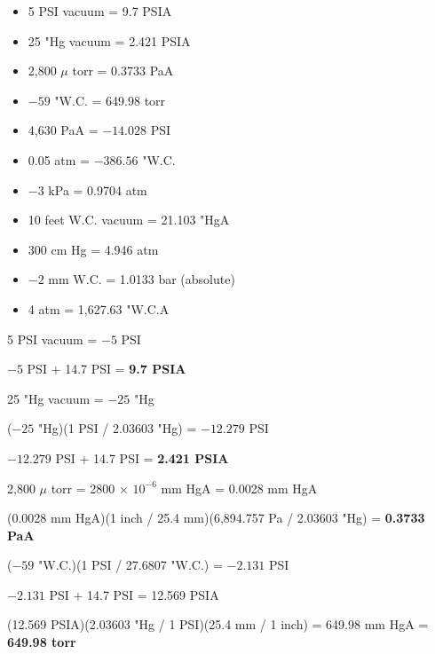 





\begin{itemize}
\item{} 5 PSI vacuum = 9.7 PSIA
\vskip 5pt
\item{} 25 "Hg vacuum = 2.421 PSIA
\vskip 5pt
\item{} 2,800 $\mu$ torr = 0.3733 PaA
\vskip 5pt
\item{} $-59$ "W.C. = 649.98 torr
\vskip 5pt
\item{} 4,630 PaA = $-14.028$ PSI
\vskip 5pt
\item{} 0.05 atm = $-386.56$ "W.C.
\vskip 5pt
\item{} $-3$ kPa = 0.9704 atm
\vskip 5pt
\item{} 10 feet W.C. vacuum = 21.103 "HgA
\vskip 5pt
\item{} 300 cm Hg = 4.946 atm
\vskip 5pt
\item{} $-2$ mm W.C. = 1.0133 bar (absolute)
\vskip 5pt
\item{} 4 atm = 1,627.63 "W.C.A
\end{itemize}








5 PSI vacuum = $-5$ PSI

$-5$ PSI + 14.7 PSI = {\bf 9.7 PSIA}


\vskip 10pt


25 "Hg vacuum = $-25$ "Hg

($-25$ "Hg)(1 PSI / 2.03603 "Hg) = $-12.279$ PSI

$-12.279$ PSI + 14.7 PSI = {\bf 2.421 PSIA}


\vskip 10pt


2,800 $\mu$ torr = 2800 $\times$ $10^{-6}$ mm HgA = 0.0028 mm HgA

(0.0028 mm HgA)(1 inch / 25.4 mm)(6,894.757 Pa / 2.03603 "Hg) = {\bf 0.3733 PaA}


\vskip 10pt


($-59$ "W.C.)(1 PSI / 27.6807 "W.C.) = $-2.131$ PSI

$-2.131$ PSI + 14.7 PSI = 12.569 PSIA

(12.569 PSIA)(2.03603 "Hg / 1 PSI)(25.4 mm / 1 inch) = 649.98 mm HgA = {\bf 649.98 torr}


\vskip 10pt


